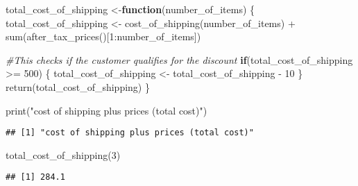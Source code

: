 \documentclass[
]{article}
\newenvironment{Shaded}{\begin{snugshade}}{\end{snugshade}}
\newcommand{\CommentTok}[1]{\textcolor[rgb]{0.56,0.35,0.01}{\textit{#1}}}
\newcommand{\ControlFlowTok}[1]{\textcolor[rgb]{0.13,0.29,0.53}{\textbf{#1}}}
\newcommand{\DecValTok}[1]{\textcolor[rgb]{0.00,0.00,0.81}{#1}}
\newcommand{\FunctionTok}[1]{\textcolor[rgb]{0.00,0.00,0.00}{#1}}
\newcommand{\NormalTok}[1]{#1}
\newcommand{\OtherTok}[1]{\textcolor[rgb]{0.56,0.35,0.01}{#1}}
\newcommand{\SpecialCharTok}[1]{\textcolor[rgb]{0.00,0.00,0.00}{#1}}
\newcommand{\StringTok}[1]{\textcolor[rgb]{0.31,0.60,0.02}{#1}}
\begin{document}
\begin{Shaded}
\begin{Highlighting}[]
\NormalTok{total\_cost\_of\_shipping }\OtherTok{\textless{}{-}}\ControlFlowTok{function}\NormalTok{(number\_of\_items) \{}
\NormalTok{  total\_cost\_of\_shipping }\OtherTok{\textless{}{-}} \FunctionTok{cost\_of\_shipping}\NormalTok{(number\_of\_items) }\SpecialCharTok{+} \FunctionTok{sum}\NormalTok{(}\FunctionTok{after\_tax\_prices}\NormalTok{()[}\DecValTok{1}\SpecialCharTok{:}\NormalTok{number\_of\_items])}
  
  \CommentTok{\#This checks if the customer qualifies for the discount}
  \ControlFlowTok{if}\NormalTok{(total\_cost\_of\_shipping }\SpecialCharTok{\textgreater{}=} \DecValTok{500}\NormalTok{) \{}
\NormalTok{    total\_cost\_of\_shipping }\OtherTok{\textless{}{-}}\NormalTok{ total\_cost\_of\_shipping }\SpecialCharTok{{-}} \DecValTok{10}
\NormalTok{  \}}
  \FunctionTok{return}\NormalTok{(total\_cost\_of\_shipping)}
\NormalTok{\}}

\FunctionTok{print}\NormalTok{(}\StringTok{"cost of shipping plus prices (total cost)"}\NormalTok{)}
\end{Highlighting}
\end{Shaded}

\begin{verbatim}
## [1] "cost of shipping plus prices (total cost)"
\end{verbatim}

\begin{Shaded}
\begin{Highlighting}[]
\FunctionTok{total\_cost\_of\_shipping}\NormalTok{(}\DecValTok{3}\NormalTok{)}
\end{Highlighting}
\end{Shaded}

\begin{verbatim}
## [1] 284.1
\end{verbatim}
\end{document}
